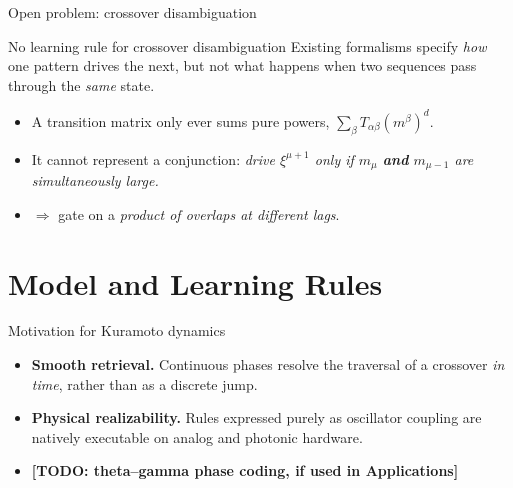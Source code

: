 \documentclass[aspectratio=169]{beamer}
\newcommand{\xxi}{\xi}
\newcommand{\mvar}{m}
\newcommand{\TODO}[1]{{\color{red}\textbf{[TODO: #1]}}}
\begin{document}
\begin{frame}{Open problem: crossover disambiguation}
  \begin{block}{No learning rule for crossover disambiguation}
    Existing formalisms specify \emph{how} one pattern drives the next, but
    not what happens when two sequences pass through the \emph{same} state.
  \end{block}
  \begin{itemize}
    \item A transition matrix only ever sums pure powers,
      $\sum_\beta T_{\alpha\beta}(\mvar^\beta)^d$.
    \item It cannot represent a conjunction: \emph{drive $\xxi^{\mu+1}$ only
      if $\mvar_\mu$ \textbf{and} $\mvar_{\mu-1}$ are simultaneously large.}
    \item $\Rightarrow$ gate on a \emph{product of overlaps at different
      lags}.
  \end{itemize}
\end{frame}


\section[Model]{Model and Learning Rules}

\begin{frame}{Motivation for Kuramoto dynamics}
  \begin{itemize}
    \item \textbf{Smooth retrieval.} Continuous phases resolve the traversal of a
      crossover \emph{in time}, rather than as a discrete jump.
    \item \textbf{Physical realizability.} Rules expressed purely as oscillator
      coupling are natively executable on analog and photonic hardware.
    \item \TODO{theta--gamma phase coding, if used in Applications}
  \end{itemize}
\end{frame}
\end{document}
